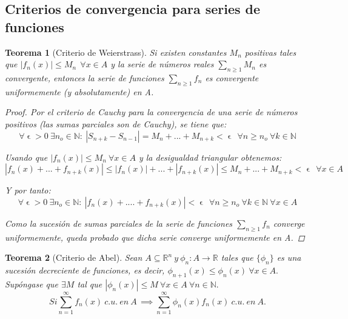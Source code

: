 \documentclass[11pt, a4paper]{article}
\let\epsilon\upvarepsilon
\theoremstyle{theorem-style}
\newtheorem{nth}{Teorema}[section]
\theoremstyle{definition-style}
\theoremstyle{remark-style}
\theoremstyle{example-style}
\begin{document}
\subsection{Criterios de convergencia para series de funciones}

\begin{nth}[Criterio de Weierstrass]
	Si existen constantes $ M_{n} $ positivas tales que $ |f_{n}(x)| \leq M_{n}\ \ \forall x \in A$ y la serie de números reales $ \sum_{n \ge 1}M_{n} $ es convergente, entonces la serie de funciones $ \sum_{n \ge 1}f_{n} $ es convergente uniformemente (y absolutamente) en A.
	
\begin{proof}
	Por el criterio de Cauchy para la convergencia de una serie de números positivos (las sumas parciales son de Cauchy), se tiene que:
	$$ \forall \epsilon > 0\ \exists n_{o} \in \mathbb{N}:\ |S_{n+k} - S_{n-1}| = M_{n} + ... + M_{n+k} < \epsilon\ \  \forall n \geq n_{o}\ \forall k \in \mathbb{N} $$
	
	Usando que $ |f_{n}(x)| \leq M_{n}\ \forall x \in A $ y la desigualdad triangular obtenemos:
	$$ |f_{n}(x) + ... + f_{n+k}(x)| \leq |f_{n}(x)| + ... + |f_{n+k}(x)| \leq M_{n} + ... + M_{n+k} < \epsilon\ \ \forall x \in A $$
	
	Y por tanto:
	$$\forall \epsilon > 0\ \exists n_{o} \in \mathbb{N}:\ |f_{n}(x) + .... + f_{n+k}(x)| < \epsilon\ \  \forall n \geq n_{o}\ \forall k \in \mathbb{N}\ \forall x \in A $$
	
	Como la sucesión de sumas parciales de la serie de funciones $\sum_{n\ge 1} f_n$ converge uniformemente, queda probado que dicha serie converge uniformemente en A.
\end{proof}
\end{nth}

\begin{nth}[Criterio de Abel] Sean $ A \subseteq \mathbb{R}^n\  y \ \phi_n : A \rightarrow \mathbb{R}$ tales que $\{\phi_n\}$ es una sucesión decreciente de funciones, es decir, $\phi_{n+1}(x) \leq \phi_n (x)\ \forall x \in A.$ Supóngase que $\exists M$ tal que $|\phi_n (x)| \leq M\ \forall x \in A\ \forall n \in \mathbb{N}.$
$$Si \sum_{n=1}^{\infty} f_n(x)\ c. u.\ en\ A\, \implies \sum_{n=1}^{\infty} \phi_n(x) f_n(x)\ c. u.\ en\ A.$$
\end{nth}

\end{document}
